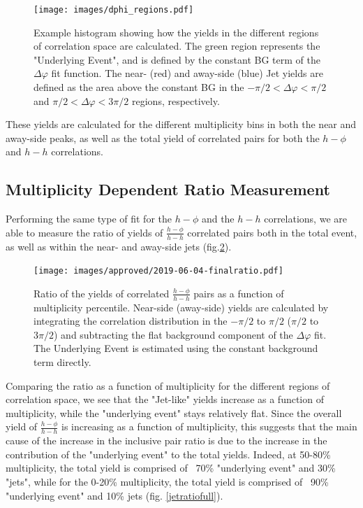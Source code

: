 \documentclass[ALICE,manyauthors]{ALICE_analysis_notes}
\begin{document}
\begin{figure}[ht]
\centering
\texttt{[image: images/dphi\_regions.pdf]}
\caption{Example histogram showing how the yields in the different regions of correlation space are calculated.  The green region represents the "Underlying Event", and is defined by the constant BG term of the $\Delta\varphi$ fit function.  The near- (red) and away-side (blue) Jet yields are defined as the area above the constant BG in the $-\pi/2 < \Delta\varphi < \pi/2$ and $\pi/2 < \Delta\varphi < 3\pi/2$ regions, respectively.}
\label{regions}
\end{figure}

These yields are calculated for the different multiplicity bins in both the near and away-side peaks, as well as the total yield of correlated pairs for both the $h-\phi$ and $h-h$ correlations.


\subsection{Multiplicity Dependent Ratio Measurement}

Performing the same type of fit for the $h-\phi$ and the $h-h$ correlations, we are able to measure the ratio of yields of $\frac{h-\phi}{h-h}$ correlated pairs both in the total event, as well as within the near- and away-side jets (fig.\ref{ratioplot}).

\begin{figure}[ht]
\centering
\texttt{[image: images/approved/2019-06-04-finalratio.pdf]}
\caption{Ratio of the yields of correlated $\frac{h-\phi}{h-h}$ pairs as a function of multiplicity percentile.  Near-side (away-side) yields are calculated by integrating the correlation distribution in the $-\pi/2$ to $\pi/2$ ($\pi/2$ to $3\pi/2$) and subtracting the flat background component of the $\Delta\varphi$ fit. The Underlying Event is estimated using the constant background term directly.}
\label{ratioplot}
\end{figure}

Comparing the ratio as a function of multiplicity for the different regions of correlation space, we see that the "Jet-like" yields increase as a function of multiplicity, while the "underlying event" stays relatively flat.  Since the overall yield of $\frac{h-\phi}{h-h}$ is increasing as a function of multiplicity, this suggests that the main cause of the increase in the inclusive pair ratio is due to the increase in the contribution of the "underlying event" to the total yields.  Indeed, at 50-80\% multiplicity, the total yield is comprised of ~70\% "underlying event" and 30\% "jets", while for the 0-20\% multiplicity, the total yield is comprised of ~90\% "underlying event" and 10\% jets (fig. \ref{jetratiofull}).
\end{document}
